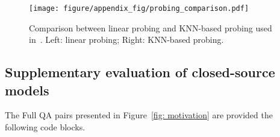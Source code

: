 \begin{figure}[t]
    \centering
    \texttt{[image: figure/appendix\_fig/probing\_comparison.pdf]}
    \caption{Comparison between linear probing and KNN-based probing used in~\citep{hou2023towards}. Left: linear probing; Right: KNN-based probing.}
    \label{fig: exp-probing-comparison}
\end{figure}



\clearpage
\newpage

\subsection{Supplementary evaluation of closed-source models}
\label{subsection: close-source model evaluation}
The Full QA pairs presented in Figure~\ref{fig: motivation} are provided the following code blocks.






